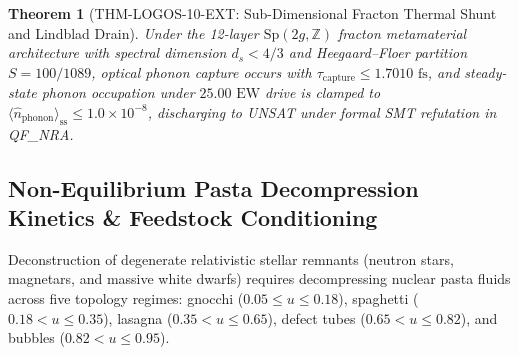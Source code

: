 \documentclass[11pt,onecolumn]{article}
\newtheorem{theorem}{Theorem}
\begin{document}
\begin{theorem}[THM-LOGOS-10-EXT: Sub-Dimensional Fracton Thermal Shunt and Lindblad Drain]
\label{thm:thm_logos_10_ext}
Under the 12-layer $\mathrm{Sp}(2g, \mathbb{Z})$ fracton metamaterial architecture with spectral dimension $d_s < 4/3$ and Heegaard--Floer partition $S = 100/1089$, optical phonon capture occurs with $\tau_{\mathrm{capture}} \le 1.7010\text{ fs}$, and steady-state phonon occupation under $25.00\text{ EW}$ drive is clamped to $\langle \hat{n}_{\mathrm{phonon}}\rangle_{\mathrm{ss}} \le 1.0 \times 10^{-8}$, discharging to UNSAT under formal SMT refutation in QF\_NRA.
\end{theorem}
\FloatBarrier

\subsection{Non-Equilibrium Pasta Decompression Kinetics \& Feedstock Conditioning}
\label{subsec:pasta_decompression_kinetics}

Deconstruction of degenerate relativistic stellar remnants (neutron stars, magnetars, and massive white dwarfs) requires decompressing nuclear pasta fluids across five topology regimes: gnocchi ($0.05 \le u \le 0.18$), spaghetti ($0.18 < u \le 0.35$), lasagna ($0.35 < u \le 0.65$), defect tubes ($0.65 < u \le 0.82$), and bubbles ($0.82 < u \le 0.95$).
\end{document}
